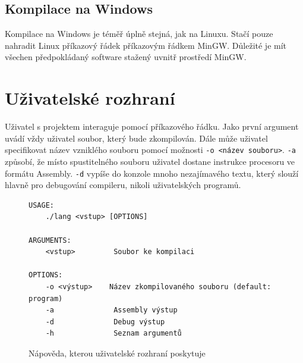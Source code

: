 \documentclass[12pt, a4paper, titlepage, abstract=on]{scrreprt}
\begin{document}
\subsection{Kompilace na Windows}
Kompilace na Windows je téměř úplně stejná, jak na Linuxu. Stačí pouze nahradit Linux příkazový řádek příkazovým řádkem MinGW.
Důležité je mít všechen předpokládaný software stažený uvnitř prostředí MinGW.

\section{Uživatelské rozhraní}
Uživatel s projektem interaguje pomocí příkazového řádku. Jako první argument uvádí vždy uživatel soubor, který bude zkompilován.
Dále může uživatel specifikovat název vzniklého souboru pomocí možnosti \texttt{-o <název souboru>}. \texttt{-a} způsobí, že
místo spustitelného souboru uživatel dostane instrukce procesoru ve formátu Assembly. \texttt{-d} vypíše do konzole mnoho nezajímavého
textu, který slouží hlavně pro debugování compileru, nikoli uživatelských programů.
\begin{figure}[H]
\begin{verbatim}
USAGE:
    ./lang <vstup> [OPTIONS]

ARGUMENTS:
    <vstup>         Soubor ke kompilaci

OPTIONS:
    -o <výstup>    Název zkompilovaného souboru (default: program)
    -a              Assembly výstup
    -d              Debug výstup
    -h              Seznam argumentů
\end{verbatim}
\caption{Nápověda, kterou uživatelské rozhraní poskytuje}
\end{figure}
\end{document}
